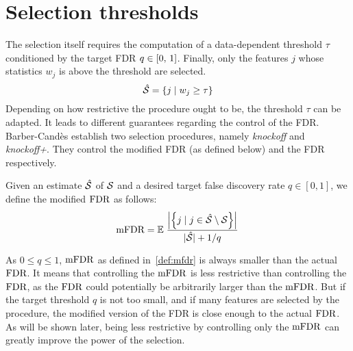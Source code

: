 \section{Selection thresholds}\label{sec:kfs}

The selection itself requires the computation of a data-dependent threshold $\tau$
conditioned by the target FDR $q \in \left[ 0,\, 1 \right]$.%
Finally, only the features $j$ whose statistics $w_j$ is above the threshold are selected.
\begin{equation}
    \hat{\mathcal{S}} = \left\{ j \mid w_j \geq \tau \right\}
\end{equation}
Depending on how restrictive the procedure ought to be, the threshold $\tau$ can be adapted.
It leads to different guarantees regarding the control of the FDR\@.
Barber-Candès establish two selection procedures,
namely \emph{knockoff} and \emph{knockoff+}.
They control the modified FDR (as defined below) and the FDR respectively.
\begin{definition}\label{def:mfdr}
Given an estimate $\hat{\mathcal{S}}$ of $\mathcal{S}$ and a desired target false discovery rate $q \in [0, 1]$,
we define the modified $\text{FDR}$ as follows:
\begin{equation*}
    \text{mFDR} = {\mathbb E}\left.
        \frac
            {\left\lvert\left\{ j \mid j \in \hat{\mathcal{S}} \setminus \mathcal{S} \right\}\right\rvert}
            {\lvert\hat{\mathcal{S}}\rvert + 1 / q}
    \right.
\end{equation*}
\end{definition}
As $0 \leq q \leq 1$, $\text{mFDR}$ as defined in~\ref{def:mfdr} is always smaller than the actual $\text{FDR}$.
It means that controlling the $\text{mFDR}$ is less restrictive than controlling the $\text{FDR}$,
as the $\text{FDR}$ could potentially be arbitrarily larger than the $\text{mFDR}$.
But if the target threshold $q$ is not too small, and if many features are selected by the procedure,
the modified version of the FDR is close enough to the actual $\text{FDR}$.
As will be shown later, being less restrictive by controlling only the $\text{mFDR}$ can greatly improve the power
of the selection.

